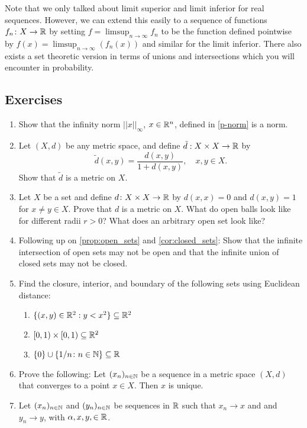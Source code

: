 \documentclass{article}
\begin{document}
Note that we only talked about limit superior and limit inferior for real sequences. However, we can extend this easily to a sequence of functions $f_n \colon X \to {\mathbb{R}}$ by setting $f = \limsup_{n\to \infty } f_n$ to be the function defined pointwise by $f(x) = \limsup_{n\to \infty } (f_n (x)) $ and similar for the limit inferior. There also exists a set theoretic version in terms of unions and intersections which you will encounter in probability.

\subsection{Exercises}
\label{exercises:metric_spaces}
\begin{enumerate}
    \item Show that the infinity norm $||x||_\infty$, $x \in {\mathbb{R}}^n$, defined in \cref{p-norm} is a norm.
    \item Let $(X,d)$ be any metric space, and define $\tilde d: X \times X \to {\mathbb{R}}$ by 
    \begin{equation*}
        \tilde d(x,y) = \frac{d(x,y)}{1+d(x,y)}, \quad x,y \in X .
    \end{equation*}
    Show that $\tilde d$ is a metric on $X$.
    \item Let $X$ be a set and define $d\colon X \times X \to {\mathbb{R}}$ by $d(x,x) = 0$ and $d(x,y)=1$ for $x\neq y \in X$. Prove that $d$ is a metric on $X$. What do open balls look like for different radii $r>0$? What does an arbitrary open set look like?
    \item Following up on \cref{prop:open_sets} and \cref{cor:closed_sets}: Show that the infinite intersection of open sets may not be open and that the infinite union of closed sets may not be closed.
    \item Find the closure, interior, and boundary of the following sets using Euclidean distance:
    \begin{enumerate}
        \item[(i)] $\{(x,y)\in {\mathbb{R}}^2 : y < x^2 \} \subseteq {\mathbb{R}}^2$
        \item[(ii)]  $[0,1)\times[0,1) \subseteq {\mathbb{R}}^2$
        \item[(iii)] $\{0 \} \cup  \{1/n \colon n \in {\mathbb{N}}\} \subseteq {\mathbb{R}}$ 
    \end{enumerate}
    \item Prove the following: Let $(x_n)_{n\in{\mathbb{N}}}$ be a sequence in a metric space $(X,d)$ that converges to a point $x \in X$. Then $x$ is unique.
    \item Let $(x_n)_{n \in {\mathbb{N}}}$ and $(y_n)_{n \in {\mathbb{N}}}$ be sequences in ${\mathbb{R}}$ such that $x_n \to x$ and and $y_n \to y$, with $\alpha, x,y, \in {\mathbb{R}}$. 

\end{enumerate}
\end{document}
